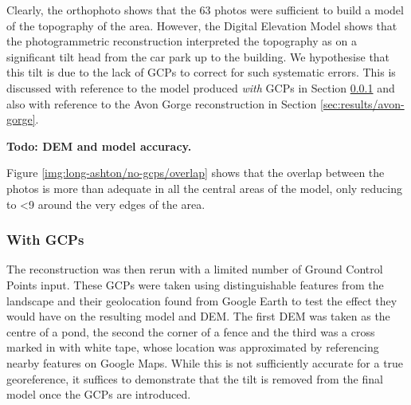Clearly, the orthophoto shows that the 63 photos were sufficient to build a
model of the topography of the area. However, the Digital Elevation Model shows
that the photogrammetric reconstruction interpreted the topography as on a
significant tilt head from the car park up to the building. We hypothesise that
this tilt is due to the lack of GCPs to correct for such systematic errors. This
is discussed with reference to the model produced \textit{with} GCPs in Section
\ref{sec:results/long-ashton/wth-gcps} and also with reference to the Avon Gorge
reconstruction in Section \ref{sec:results/avon-gorge}.

\textbf{Todo: DEM and model accuracy.}

Figure \ref{img:long-ashton/no-gcps/overlap} shows that the overlap between the
photos is more than adequate in all the central areas of the model, only
reducing to \textless 9 around the very edges of the area.

\subsubsection{With GCPs}
\label{sec:results/long-ashton/wth-gcps}

The reconstruction was then rerun with a limited number of Ground Control Points
input. These GCPs were taken using distinguishable features from the landscape
and their geolocation found from Google Earth to test the effect they would have
on the resulting model and DEM. The first DEM was taken as the centre of a pond,
the second the corner of a fence and the third was a cross marked in with white
tape, whose location was approximated by referencing nearby features on Google
Maps. While this is not sufficiently accurate for a true georeference, it
suffices to demonstrate that the tilt is removed from the final model once the
GCPs are introduced.

